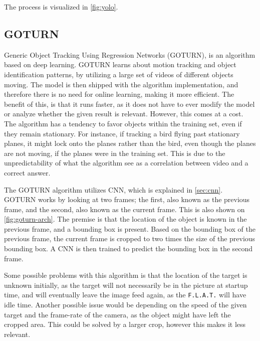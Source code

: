 The process is visualized in \autoref{fig:yolo}.


\subsection{GOTURN}
Generic Object Tracking Using Regression Networks (GOTURN), is an algorithm based on deep learning\cite{goturn}.
GOTURN learns about motion tracking and object identification patterns, by utilizing a large set of videos of different objects moving.
The model is then shipped with the algorithm implementation, and therefore there is no need for online learning, making it more efficient.
The benefit of this, is that it runs faster, as it does not have to ever modify the model or analyze whether the given result is relevant.
However, this comes at a cost. 
The algorithm has a tendency to favor objects within the training set, even if they remain stationary.
For instance, if tracking a bird flying past stationary planes, it might lock onto the planes rather than the bird, even though the planes are not moving, if the planes were in the training set.
This is due to the unpredictability of what the algorithm see as a correlation between video and a correct answer.


The GOTURN algorithm utilizes CNN, which is explained in \autoref{sec:cnn}.
GOTURN works by looking at two frames; the first, also known as the previous frame, and the second, also known as the current frame.
This is also shown on \autoref{fig:goturn-arch}.
The premise is that the location of the object is known in the previous frame, and a bounding box is present.
Based on the bounding box of the previous frame, the current frame is cropped to two times the size of the previous bounding box.
A CNN is then trained to predict the bounding box in the second frame.

Some possible problems with this algorithm is that the location of the target is unknown initially, as the target will not necessarily be in the picture at startup time, and will eventually leave the image feed again, as the \texttt{F.L.A.T.} will have idle time.
Another possible issue would be depending on the speed of the given target and the frame-rate of the camera, as the object might have left the cropped area. 
This could be solved by a larger crop, however this makes it less relevant.


